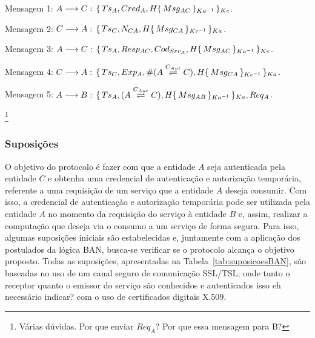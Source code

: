 \begin{enumerate}
  \item Mensagem 1: ${A}\longrightarrow{C}:\,{\{\,{Ts_A,Cred_A,H{\{\,{Msg_{AC}}\,\}_{Ka ^{-1}}}}\,\}_{Kc}}$.
  \item Mensagem 2: ${C}\longrightarrow{A}:\,{\{\,{Ts_C,{N_{CA}},H{\{\,{Msg_{CA}}\,\}_{Kc ^{-1}}}}\,\}_{Ka}}$.
  \item Mensagem 3: ${A}\longrightarrow{C}:\,{\{\,{Ts_A,{Resp_{AC}},Cod_{Srv_A},H{\{\,{Msg_{AC}}\,\}_{Ka ^{-1}}}}\,\}_{Kc}}$.
  \item Mensagem 4: ${C}\longrightarrow{A}:\,{\{\,{Ts_C,Exp_A,\#({A}\stackrel{{C_{Aut}}}{\rightleftharpoons}{C}),H{\{\,{Msg_{CA}}\,\}_{Kc ^{-1}}}}\,\}_{Ka}}$.
  {\color{blue}\item Mensagem 5: ${A}\longrightarrow{B}:\,{\{\,{Ts_A,({A}\stackrel{{C_{Aut}}}{\rightleftharpoons}{C}),H{\{\,{Msg_{AB}}\,\}_{Ka ^{-1}}}}\,\}_{Ka}},{Req_A}$.}\footnote{V\'{a}rias d\'{u}vidas. Por que enviar
$Req_A$? Por que essa mensagem para B?}
\end{enumerate}

\subsubsection{Suposições}\label{sec:Suposicoes}

O objetivo do protocolo é fazer com que a entidade ${A}$ seja autenticada pela entidade ${C}$ e obtenha uma credencial de autenticação e autorização temporária, referente a uma requisição de um serviço que a entidade ${A}$ deseja consumir. Com isso, a credencial de autenticação e autorização temporária pode ser utilizada pela entidade ${A}$ no momento da requisição do serviço \`{a} entidade ${B}$ e, assim, realizar a computa\c c\~{a}o que deseja via o consumo a um servi\c co de forma segura. Para isso, algumas suposições iniciais são estabelecidas e, juntamente com a aplicação  dos postulados da lógica BAN, busca-se verificar se o protocolo alcan\c ca o objetivo proposto. Todas as suposições, apresentadas na Tabela~\ref{tab:suposicoesBAN}, são baseadas no uso de um canal seguro de comunicação SSL/TSL; onde tanto o receptor  quanto o emissor do serviço são conhecidos e
autenticados {\color{blue}isso eh necess\'{a}rio indicar?} com o uso de certificados digitais X.509.

